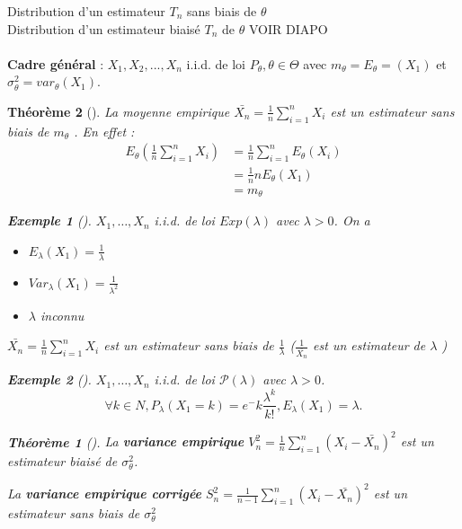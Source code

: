 \documentclass{article}
\theoremstyle{plain}%
\newtheorem{thm}{Théorème}[section]
\theoremstyle{definition}
\newtheorem{exmp}{Exemple}[section]
\theoremstyle{remark}
\begin{document}
Distribution d'un estimateur $ T_n $ sans biais de $ \theta $ \\
Distribution d'un estimateur biaisé $ T_n $ de $ \theta $ 
VOIR DIAPO \\\\


\textbf{Cadre général} : $ X_1, X_2, ... , X_n $ i.i.d. de loi $ P_\theta, \theta \in \Theta  $ avec $ m_\theta = E_\theta =(X_1) $ et $ \sigma ^2_\theta = var_\theta (X_1) $. \\

\begin{thm}[]
    La moyenne empirique $ \bar{X_n} = \frac{1}{n}\sum_{i=1}^{n}X_i $ est un estimateur sans biais de $ m_\theta  $ . En effet : \begin{align*}
        E_\theta (\frac{1}{n}\sum_{i=1}^{n} X_i) &= \frac{1}{n}\sum_{i=1}^{n} E_\theta (X_i) \\ 
        & = \frac{1}{n} n E_\theta (X_1)\\
        &= m_\theta 
    \end{align*}

    \begin{exmp}[]
        $ X_1, \dots, X_n $ i.i.d. de loi $ Exp(\lambda) $ avec $ \lambda > 0 $. On a \begin{itemize}
            \item $ E_\lambda (X_1) = \frac{1}{\lambda } $ 
            \item $ Var_\lambda (X_1) = \frac{1}{\lambda ^2} $ 
            \item $ \lambda  $ inconnu
        \end{itemize}
        $ \bar{X_n} = \frac{1}{n}\sum_{i=1}^{n} X_i$ est un estimateur sans biais de $\frac{1}{\lambda}$ ($ \frac{1}{\bar{X_n}} $ est un estimateur de $ \lambda  $ ) 
    \end{exmp}
    \begin{exmp}[]
        $ X_1, \dots, X_n $ i.i.d. de loi $ \mathcal{P}(\lambda) $ avec $ \lambda > 0 $.
        \[
            \forall k \in N, P_\lambda (X_1 = k) = e^-k \frac{\lambda ^k }{k!}, E_\lambda (X_1)= \lambda 
        .\]
    \end{exmp}

    \begin{thm}[]
        La \textbf{variance empirique} $ V^2_n = \frac{1}{n}\sum_{i=1}^{n} (X_i-\bar{X_n})^2  $ est un estimateur biaisé de $ \sigma _\theta ^2 $.

        La \textbf{variance empirique corrigée} $ S_n^2 = \frac{1}{n-1}\sum_{i=1}^{n}(X_i - \bar{X_n})^2 $ est un estimateur sans biais de $ \sigma_\theta ^2 $ 


\end{thm}
\end{thm}
\end{document}
